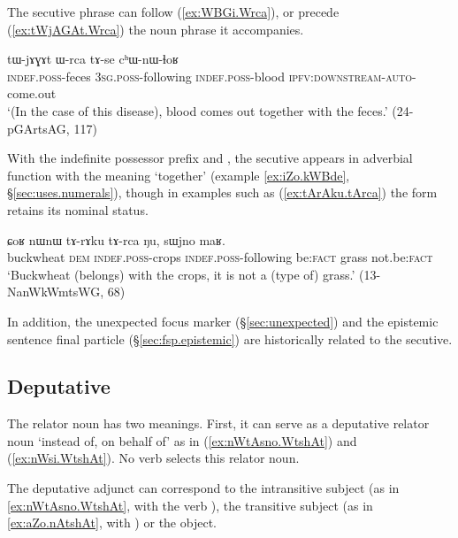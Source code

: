 The secutive phrase can follow  (\ref{ex:WBGi.Wrca}), or precede (\ref{ex:tWjAGAt.Wrca}) the noun phrase it accompanies.

\begin{exe}
\ex \label{ex:tWjAGAt.Wrca}
 \gll   tɯ-jɤɣɤt ɯ-rca tɤ-se cʰɯ-nɯ-ɬoʁ \\
 \textsc{indef}.\textsc{poss}-feces \textsc{3sg}.\textsc{poss}-following \textsc{indef}.\textsc{poss}-blood \textsc{ipfv}:\textsc{downstream}-\textsc{auto}-come.out \\
 \glt `(In the case of this disease), blood comes out together with the feces.' (24-pGArtsAG, 117)
 \end{exe}

With the indefinite possessor prefix  and  , the secutive appears in adverbial function with the meaning `together' (example \ref{ex:iZo.kWBde}, §\ref{sec:uses.numerals}), though in examples such as  (\ref{ex:tArAku.tArca}) the form   retains its nominal status.


\begin{exe}
\ex \label{ex:tArAku.tArca}
 \gll ɕoʁ nɯnɯ tɤ-rɤku tɤ-rca ŋu, sɯjno maʁ. \\
 buckwheat \textsc{dem} \textsc{indef}.\textsc{poss}-crops \textsc{indef}.\textsc{poss}-following be:\textsc{fact} grass not.be:\textsc{fact} \\
 \glt `Buckwheat (belongs) with the crops, it is not a (type of) grass.' (13-NanWkWmtsWG, 68)
\end{exe}

In addition, the unexpected focus marker  (§\ref{sec:unexpected}) and the epistemic sentence final particle  (§\ref{sec:fsp.epistemic}) are historically related to the secutive.
 
\subsection{Deputative} \label{sec:deputative} 
The relator noun  has two meanings. First, it can serve as a deputative relator noun `instead of, on behalf of' as in (\ref{ex:nWtAsno.WtshAt}) and (\ref{ex:nWsi.WtshAt}). No verb selects this relator noun. 

The deputative adjunct can correspond to the intransitive subject (as in \ref{ex:nWtAsno.WtshAt}, with the verb ), the transitive subject (as in \ref{ex:aZo.nAtshAt}, with ) or the object.


